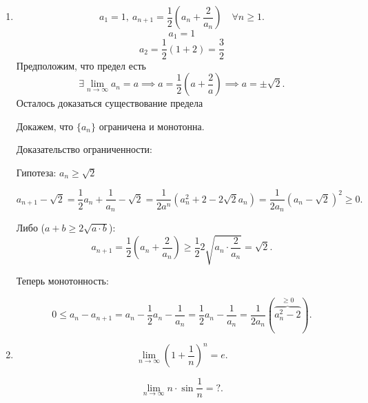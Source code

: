 \begin{enumerate}
\item
    \begin{equation*}
        a_1 = 1, \ a_{n + 1} = \frac{1}{2}(a_n + \frac{2}{a_n}) \quad \forall n \geq 1
    .\end{equation*}
    \begin{equation*}
        a_1 = 1
    \end{equation*}
    \begin{equation*}
        a_2 = \frac{1}{2}(1 + 2) = \frac{3}{2}
    \end{equation*}
    Предположим, что предел есть
    \begin{equation*}
        \exists \lim_{n \to \infty} a_n = a \implies a = \frac{1}{2}\left(a + \frac{2}{a}\right) \implies a = \pm \sqrt{2}
    .\end{equation*}
    Осталось доказаться существование предела

    Докажем, что $\{a_n\}$ ограничена и монотонна.

    Доказательство ограниченности:

    Гипотеза: $a_n \geq \sqrt{2}$

    \begin{equation*}
        a_{n + 1} - \sqrt{2} = \frac{1}{2} a_n + \frac{1}{a_n} - \sqrt{2} = \frac{1}{2a^n}(a_n^2 + 2 - 2\sqrt{2}a_n) = \frac{1}{2a_n} (a_n - \sqrt{2})^2 \geq 0
    .\end{equation*}

    Либо ($a + b \geq 2 \sqrt{a \cdot b}$):
    \begin{equation*}
        a_{n + 1} = \frac{1}{2}(a_n + \frac{2}{a_n}) \geq \frac{1}{2} 2\sqrt{a_n \cdot \frac{2}{a_n}} = \sqrt{2}
    .\end{equation*}

    Теперь монотонность:

    \begin{equation*}
        0 \leq a_n - a_{n + 1} = a_n - \frac{1}{2}a_n - \frac{1}{a_n} = \frac{1}{2}a_n - \frac{1}{a_n} = \frac{1}{2a_n}(\overbrace{a_n^2 - 2}^{\geq 0})
    .\end{equation*}

\item
    \begin{equation*}
        \lim_{n \to \infty} (1 + \frac{1}{n})^n = e
    .\end{equation*}

    \begin{equation*}
        \lim_{n \to \infty} n \cdot \sin \frac{1}{n} = ?
    .\end{equation*}


\end{enumerate}
